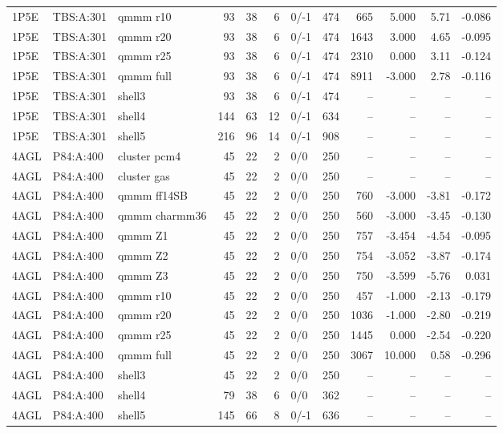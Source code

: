 {\begin{longtable}{lllrrrlrrrrr}
1P5E & TBS:A:301 & qmmm r10 & 93 & 38 & 6 & 0/-1 & 474 & 665 & 5.000 & 5.71 & -0.086\\
1P5E & TBS:A:301 & qmmm r20 & 93 & 38 & 6 & 0/-1 & 474 & 1643 & 3.000 & 4.65 & -0.095\\
1P5E & TBS:A:301 & qmmm r25 & 93 & 38 & 6 & 0/-1 & 474 & 2310 & 0.000 & 3.11 & -0.124\\
1P5E & TBS:A:301 & qmmm full & 93 & 38 & 6 & 0/-1 & 474 & 8911 & -3.000 & 2.78 & -0.116\\
1P5E & TBS:A:301 & shell3 & 93 & 38 & 6 & 0/-1 & 474 & -- & -- & -- & --\\
1P5E & TBS:A:301 & shell4 & 144 & 63 & 12 & 0/-1 & 634 & -- & -- & -- & --\\
1P5E & TBS:A:301 & shell5 & 216 & 96 & 14 & 0/-1 & 908 & -- & -- & -- & --\\
4AGL & P84:A:400 & cluster pcm4 & 45 & 22 & 2 & 0/0 & 250 & -- & -- & -- & --\\
4AGL & P84:A:400 & cluster gas & 45 & 22 & 2 & 0/0 & 250 & -- & -- & -- & --\\
4AGL & P84:A:400 & qmmm ff14SB & 45 & 22 & 2 & 0/0 & 250 & 760 & -3.000 & -3.81 & -0.172\\
4AGL & P84:A:400 & qmmm charmm36 & 45 & 22 & 2 & 0/0 & 250 & 560 & -3.000 & -3.45 & -0.130\\
4AGL & P84:A:400 & qmmm Z1 & 45 & 22 & 2 & 0/0 & 250 & 757 & -3.454 & -4.54 & -0.095\\
4AGL & P84:A:400 & qmmm Z2 & 45 & 22 & 2 & 0/0 & 250 & 754 & -3.052 & -3.87 & -0.174\\
4AGL & P84:A:400 & qmmm Z3 & 45 & 22 & 2 & 0/0 & 250 & 750 & -3.599 & -5.76 & 0.031\\
4AGL & P84:A:400 & qmmm r10 & 45 & 22 & 2 & 0/0 & 250 & 457 & -1.000 & -2.13 & -0.179\\
4AGL & P84:A:400 & qmmm r20 & 45 & 22 & 2 & 0/0 & 250 & 1036 & -1.000 & -2.80 & -0.219\\
4AGL & P84:A:400 & qmmm r25 & 45 & 22 & 2 & 0/0 & 250 & 1445 & 0.000 & -2.54 & -0.220\\
4AGL & P84:A:400 & qmmm full & 45 & 22 & 2 & 0/0 & 250 & 3067 & 10.000 & 0.58 & -0.296\\
4AGL & P84:A:400 & shell3 & 45 & 22 & 2 & 0/0 & 250 & -- & -- & -- & --\\
4AGL & P84:A:400 & shell4 & 79 & 38 & 6 & 0/0 & 362 & -- & -- & -- & --\\
4AGL & P84:A:400 & shell5 & 145 & 66 & 8 & 0/-1 & 636 & -- & -- & -- & --\\

\end{longtable}}
